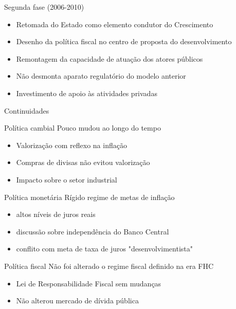 \documentclass[presentation]{beamer}
\begin{document}
\begin{frame}[label={sec:org22d2d64}]{Segunda fase (2006-2010)}
\begin{itemize}
\item Retomada do Estado como elemento condutor do Crescimento
\item Desenho da política fiscal no centro de proposta do desenvolvimento
\item Remontagem da capacidade de atuação dos atores públicos
\item Não desmonta aparato regulatório do modelo anterior
\item Investimento de apoio às atividades privadas
\end{itemize}
\end{frame}

\begin{frame}[label={sec:orgaae0075}]{Continuidades}
\begin{block}{Política cambial}
Pouco mudou ao longo do tempo

\begin{itemize}
\item Valorização com reflexo na inflação
\item Compras de divisas não evitou valorização
\item Impacto sobre o setor industrial
\end{itemize}
\end{block}

\begin{block}{Política monetária}
Rígido regime de metas de inflação

\begin{itemize}
\item altos níveis de juros reais
\item discussão sobre independência do Banco Central
\item conflito com meta de taxa de juros "desenvolvimentista"
\end{itemize}
\end{block}

\begin{block}{Política fiscal}
Não foi alterado o regime fiscal definido na era FHC

\begin{itemize}
\item Lei de Responsabilidade Fiscal sem mudanças
\item Não alterou mercado de dívida pública
\end{itemize}
\end{block}
\end{frame}
\end{document}
